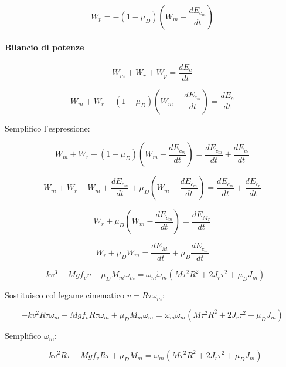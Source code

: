 \documentclass[main.tex]{subfiles}
\begin{document}
\[
  W_p = -(1-\mu_D)(W_m - \dfrac{dE_{c_m}}{dt})
\]

\paragraph{Bilancio di potenze}
\setcounter{equation}{0}
\begin{equation}
  W_m + W_r + W_p = \dfrac{dE_c}{dt}
\end{equation}

\begin{equation}
  W_m + W_r - (1-\mu_D)(W_m - \dfrac{dE_{c_m}}{dt}) = \dfrac{dE_c}{dt}
\end{equation}

Semplifico l'espressione:

\begin{equation}
  W_m + W_r - (1-\mu_D)(W_m - \dfrac{dE_{c_m}}{dt}) = \dfrac{dE_{c_m}}{dt}  + \dfrac{dE_{c_r}}{dt}
\end{equation}

\begin{equation}
  W_m + W_r - W_m + \dfrac{dE_{c_m}}{dt} + \mu_D(W_m - \dfrac{dE_{c_m}}{dt}) = \dfrac{dE_{c_m}}{dt}  + \dfrac{dE_{c_r}}{dt}
\end{equation}

\begin{equation}
  W_r + \mu_D(W_m - \dfrac{dE_{c_m}}{dt}) = \dfrac{dE_{M_r}}{dt}
\end{equation}

\begin{equation}
  W_r + \mu_DW_m  = \dfrac{dE_{M_r}}{dt} + \mu_D\dfrac{dE_{c_m}}{dt}
\end{equation}

\begin{equation}
  -kv^3 - Mgf_vv + \mu_DM_m\omega_m  = \omega_m\dot{\omega}_m(M\tau^2R^2 + 2J_r\tau^2 + \mu_DJ_m)
\end{equation}

Sostituisco col legame cinematico $v = R\tau\omega_m$:

\begin{equation}
  -kv^2R\tau\omega_m - Mgf_vR\tau\omega_m + \mu_DM_m\omega_m  = \omega_m\dot{\omega}_m(M\tau^2R^2 + 2J_r\tau^2 + \mu_DJ_m)
\end{equation}

Semplifico $\omega_m$:

\begin{equation}
  -kv^2R\tau - Mgf_vR\tau + \mu_DM_m  = \dot{\omega}_m(M\tau^2R^2 + 2J_r\tau^2 + \mu_DJ_m)
\end{equation}
\end{document}
